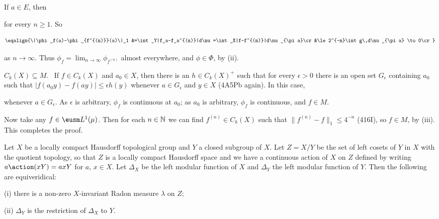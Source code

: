 {If $a\in E$, then


\noindent for every $n\ge 1$.   So

$$\eqalign{\|\phi_f(a)-\phi_{f^{(n)}}(a)\|_1
&=\int_Y|f_a-f_a^{(n)}|d\nu
=\int_X|f-f^{(n)}|d\nu_{\pi a}\cr
&\le 2^{-n}\int g\,d\nu_{\pi a}
\to 0\cr}$$

\noindent as $n\to\infty$.   Thus
$\phi_f=\lim_{n\to\infty}\phi_{f^{(n)}}$ almost everywhere, and
$\phi\in\Phi$, by (ii).\ \Qed

\medskip

 $C_k(X)\subseteq M$.   \Prf\ If $f\in C_k(X)$ and
$a_0\in X$, then there is an $h\in C_k(X)^+$ such that for every
$\epsilon>0$ there is an open set $G_{\epsilon}$ containing $a_0$ such
that $|f(a_0y)-f(ay)|\le\epsilon h(y)$ whenever
$a\in G_{\epsilon}$ and $y\in X$ (4A5Pb again).   In this case,


\noindent whenever $a\in G_{\epsilon}$.   As $\epsilon$ is arbitrary,
$\phi_f$ is continuous at $a_0$;  as $a_0$ is arbitrary, $\phi_f$ is
continuous, and $f\in M$.\ \Qed

\medskip

 Now take any $f\in\eusm L^1(\mu)$.   Then for each
$n\in\Bbb N$ we can find $f^{(n)}\in C_k(X)$ such that
$\|f^{(n)}-f\|_1\le 4^{-n}$ (416I), so $f\in M$, by (iii).
This completes the proof.
}%

Let $X$ be a locally compact Hausdorff
topological group and $Y$ a closed subgroup of $X$.   Let $Z=X/Y$ be the
set of left cosets of $Y$ in $X$ with the quotient topology, so that
$Z$ is a locally compact Hausdorff space and we have a continuous
action of $X$ on $Z$ defined by writing $a\action(xY)=axY$ for $a$,
$x\in X$.   Let $\Delta_X$ be the left modular function
of $X$ and $\Delta_Y$ the left modular function of $Y$.   Then the
following are equiveridical:

(i) there is a non-zero $X$-invariant Radon measure $\lambda$ on $Z$;

(ii) $\Delta_Y$ is the restriction of $\Delta_X$ to $Y$.

